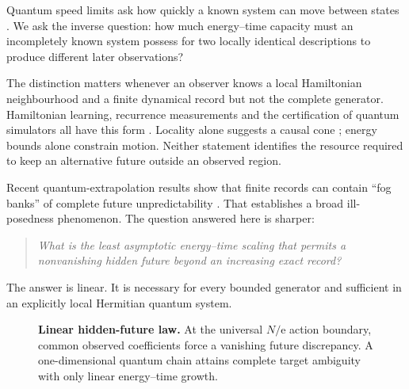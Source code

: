 \documentclass[10pt]{article}
\numberwithin{equation}{section}
\theoremstyle{definition}
\theoremstyle{remark}
\newcommand{\ee}{\mathrm e}
\newcommand{\norm}[1]{\lVert #1\rVert}
\begin{document}
Quantum speed limits ask how quickly a known system can move between states
\cite{MandelstamTamm1945,MargolusLevitin1998,NessEtAl2022}.  We ask the
inverse question: how much energy--time capacity must an incompletely known
system possess for two locally identical descriptions to produce different
later observations?

The distinction matters whenever an observer knows a local Hamiltonian
neighbourhood and a finite dynamical record but not the complete generator.
Hamiltonian learning, recurrence measurements and the certification of
quantum simulators all have this form
\cite{BaireyAradLindner2019,RauerEtAl2018}.  Locality alone suggests a
causal cone \cite{LiebRobinson1972}; energy bounds alone constrain motion.
Neither statement identifies the resource required to keep an alternative
future outside an observed region.

Recent quantum-extrapolation results show that finite records can contain
``fog banks'' of complete future unpredictability
\cite{ManosWeilenmannNavascues2026}.  That establishes a broad
ill-posedness phenomenon.  The question answered here is sharper:
\begin{quote}
\emph{What is the least asymptotic energy--time scaling that permits a
nonvanishing hidden future beyond an increasing exact record?}
\end{quote}
The answer is linear.  It is necessary for every bounded generator and
sufficient in an explicitly local Hermitian quantum system.

\begin{figure}[t]
\centering
{}
\caption{\textbf{Linear hidden-future law.}
At the universal \(N/\ee\) action boundary, common observed coefficients
force a vanishing future discrepancy.  A one-dimensional quantum chain
attains complete target ambiguity with only linear energy--time growth.}
\label{fig:law}
\end{figure}
\end{document}
